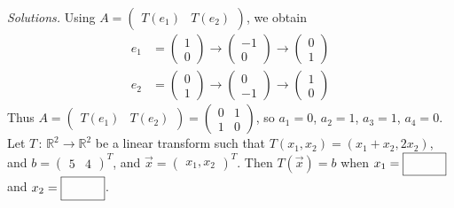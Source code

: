     \ifnum {} {\color{DarkBlue} \textit{Solutions.} 
    Using $A = \begin{pmatrix} T(e_1) & T(e_2) \end{pmatrix}$, we obtain
    \begin{align}
        e_1 &= \begin{pmatrix} 1\\0 \end{pmatrix} \to \begin{pmatrix}-1\\0 \end{pmatrix} \to \begin{pmatrix}0\\1 \end{pmatrix} \\
        e_2 &= \begin{pmatrix} 0 \\1 \end{pmatrix} \to \begin{pmatrix} 0\\-1 \end{pmatrix} \to \begin{pmatrix}1\\0 \end{pmatrix}
    \end{align}
    Thus $A = \begin{pmatrix} T(e_1) & T(e_2) \end{pmatrix} = \begin{pmatrix} 0 & 1\\1 & 0\end{pmatrix}$, so $a_1=0$, $a_2=1$, $a_3=1$, $a_4=0$. 
    } 
    \else
    \fi    
\fi 
\ifnum {}
    Let $T \, : \, \mathbb R^2 \to \mathbb R^2$ be a linear transform such that $T(x_1,x_2) = (x_1+x_2, 2x_2)$, and $b = \begin{pmatrix} 5& 4\end{pmatrix}^T$, and $\vec x= \begin{pmatrix} x_1,x_2 \end{pmatrix}^T$. Then $T(\vec x) = b$ when $x_1 = \framebox{\strut\hspace{1cm}}$ and $x_2 = \framebox{\strut\hspace{1cm}}$. 
    
